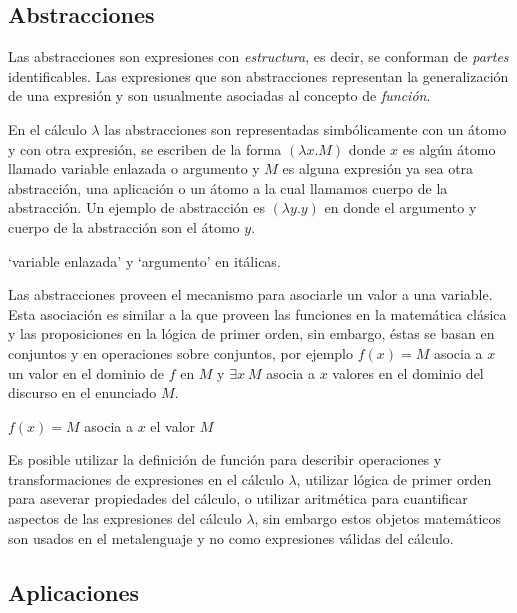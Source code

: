 \subsection{Abstracciones}
\label{sec:abstracciones}

Las abstracciones son expresiones con \emph{estructura}, es decir, se conforman de \emph{partes} identificables. Las expresiones que son abstracciones representan la generalización de una expresión y son usualmente asociadas al concepto de \emph{función}.

En el cálculo \( λ \) las abstracciones son representadas simbólicamente con un átomo y con otra expresión, se escriben de la forma \( (λx.M) \) donde \( x \) es algún átomo llamado variable enlazada o argumento y \( M \) es alguna expresión ya sea otra abstracción, una aplicación o un átomo a la cual llamamos cuerpo de la abstracción. Un ejemplo de abstracción es \( (λy.y) \) en donde el argumento y cuerpo de la abstracción son el átomo \( y \).

\begin{Gutu}
`variable enlazada' y `argumento' en itálicas.
\end{Gutu}

Las abstracciones proveen el mecanismo para asociarle un valor a una variable. Esta asociación es similar a la que proveen las funciones en la matemática clásica y las proposiciones en la lógica de primer orden, sin embargo, éstas se basan en conjuntos y en operaciones sobre conjuntos, por ejemplo \( f(x)=M \) asocia a \( x \) un valor en el dominio de \( f \) en \( M \) y \( \exists x\ M \) asocia a \( x \) valores en el dominio del discurso en el enunciado \( M \).

\begin{Gutu}
$f(x)=M$ asocia a $x$ el valor $M$
\end{Gutu}

Es posible utilizar la definición de función para describir operaciones y transformaciones de expresiones en el cálculo \( λ \), utilizar lógica de primer orden para aseverar propiedades del cálculo, o utilizar aritmética para cuantificar aspectos de las expresiones del cálculo \( λ \), sin embargo estos objetos matemáticos son usados en el metalenguaje y no como expresiones válidas del cálculo.


\subsection{Aplicaciones}
\label{sec:aplicaciones}

